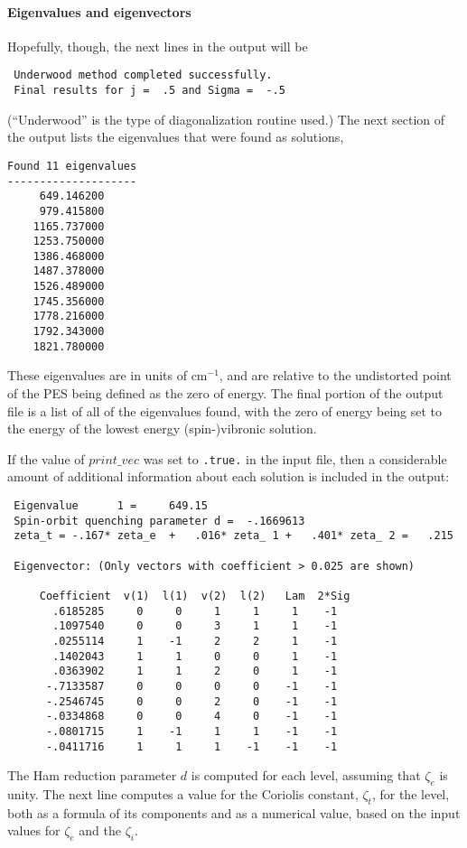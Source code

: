 \documentclass{article}
\newcommand{\wn}{cm$^{-1}$}
\begin{document}
\paragraph{Eigenvalues and eigenvectors}
Hopefully, though, the next lines in the output will be
\begin{verbatim}
 Underwood method completed successfully.
 Final results for j =  .5 and Sigma =  -.5
\end{verbatim}
(``Underwood'' is the type of diagonalization routine used.) The next
section of the output lists the eigenvalues that were found as
solutions,
\begin{verbatim}
Found 11 eigenvalues
--------------------
     649.146200
     979.415800
    1165.737000
    1253.750000
    1386.468000
    1487.378000
    1526.489000
    1745.356000
    1778.216000
    1792.343000
    1821.780000
\end{verbatim}
These eigenvalues are in units of \wn , and are relative to the
undistorted point of the PES being defined as the zero of energy. The
final portion of the output file is a list of all of the eigenvalues
found, with the zero of energy being set to the energy of the lowest
energy (spin-)vibronic solution.

If the value of $print\_vec$ was set to {\tt .true.} in the input
file, then a considerable amount of additional information about each
solution is included in the output:
\begin{verbatim}
 Eigenvalue      1 =     649.15
 Spin-orbit quenching parameter d =  -.1669613
 zeta_t = -.167* zeta_e  +   .016* zeta_ 1 +   .401* zeta_ 2 =   .215
 
 Eigenvector: (Only vectors with coefficient > 0.025 are shown)
 
     Coefficient  v(1)  l(1)  v(2)  l(2)   Lam  2*Sig
       .6185285     0     0     1     1     1    -1
       .1097540     0     0     3     1     1    -1
       .0255114     1    -1     2     2     1    -1
       .1402043     1     1     0     0     1    -1
       .0363902     1     1     2     0     1    -1
      -.7133587     0     0     0     0    -1    -1
      -.2546745     0     0     2     0    -1    -1
      -.0334868     0     0     4     0    -1    -1
      -.0801715     1    -1     1     1    -1    -1
      -.0411716     1     1     1    -1    -1    -1

\end{verbatim}
The Ham reduction parameter $d$ is computed for each level, assuming
that $\zeta _e$ is unity. The next line computes a value for the
Coriolis constant, $\zeta _t$, for the level, both as a formula of its
components and as a numerical value, based on the input values for
$\zeta _e$ and the $\zeta _i$. 
\end{document}
